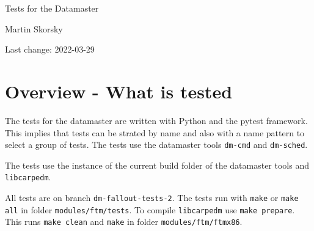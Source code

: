 \documentclass[12pt,a4paper]{report}
\begin{document}
\begin{titlepage}
\vspace{2cm}
\begin{center}
\Huge{Tests for the Datamaster}

\Large{Martin Skorsky}

\Large{Last change: 2022-03-29}
\end{center}
\vfill
\end{titlepage}

\tableofcontents

\chapter{Overview - What is tested}
The tests for the datamaster are written with Python and the pytest framework. This implies that tests can be strated
by name and also with a name pattern to select a group of tests. The tests use the datamaster tools \texttt{dm-cmd}
and \texttt{dm-sched}.

The tests use the instance of the current build folder of the datamaster tools and \texttt{libcarpedm}.

All tests are on branch \texttt{dm-fallout-tests-2}. The tests run with \texttt{make} or \texttt{make all} in folder \texttt{modules/ftm/tests}.
To compile \texttt{libcarpedm} use \texttt{make prepare}. This runs \texttt{make clean} and \texttt{make} in folder \texttt{modules/ftm/ftmx86}.
\end{document}
